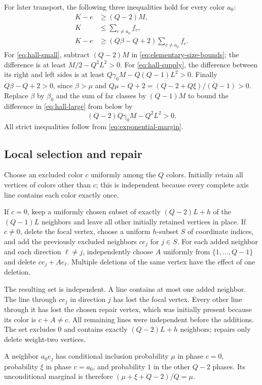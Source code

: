 \documentclass[11pt]{article}
\theoremstyle{definition}
\theoremstyle{remark}
\begin{document}
For later transport, the following three inequalities hold for every
color $a_0$:
\begin{align}
 K-e&\ge (Q-2)M, \label{eq:hall-small}\\
 K&\le\sum_{c\ne a_0}f_c, \label{eq:hall-supply}\\
 K-e&\ge (Q\beta-Q+2)\sum_{c\ne a_0}f_c.
 \label{eq:hall-large}
\end{align}
For \eqref{eq:hall-small}, subtract $(Q-2)M$ in
\eqref{eq:elementary-size-bounds}; the difference is at least
$M/2-Q^2L^2>0$.  For \eqref{eq:hall-supply}, the difference between its
right and left sides is at least
$Q\gamma_0M-Q(Q-1)L^2>0$.  Finally $Q\beta-Q+2>0$, since
$\beta>\mu$ and
$Q\mu-Q+2=(Q-2+Q\xi)/(Q-1)>0$.
Replace $\beta$ by $\beta_0$ and the sum of far classes by $(Q-1)M$ to
bound the difference in \eqref{eq:hall-large} from below by
\[
 (Q-2)Q\gamma_0M-Q^2L^2>0.
\]
All strict inequalities follow from \eqref{eq:exponential-margin}.

\subsection{Local selection and repair}
\label{app:local-repair}

Choose an excluded color $c$ uniformly among the $Q$ colors.  Initially
retain all vertices of colors other than $c$; this is independent because
every complete axis line contains each color exactly once.

If $c=0$, keep a uniformly chosen subset of exactly $(Q-2)L+h$ of the
$(Q-1)L$ neighbors and leave all other initially retained vertices in
place.  If $c\ne0$, delete the focal vertex, choose a uniform $h$-subset
$S$ of coordinate indices, and add the previously excluded neighbors
$c e_j$ for $j\in S$.  For each added neighbor and each direction
$\ell\ne j$, independently choose $A$ uniformly from
$\{1,\ldots,Q-1\}$ and delete $c e_j+A e_\ell$.  Multiple deletions of
the same vertex have the effect of one deletion.

The resulting set is independent.  A line contains at most one added
neighbor.  The line through $c e_j$ in direction $j$ has lost the focal
vertex.  Every other line through it has lost the chosen repair vertex,
which was initially present because its color is $c+A\ne c$.
All remaining lines were independent before the additions.  The set
excludes $0$ and contains exactly $(Q-2)L+h$ neighbors; repairs only
delete weight-two vertices.

A neighbor $a_0e_j$ has conditional inclusion probability $\mu$ in phase
$c=0$, probability $\xi$ in phase $c=a_0$, and probability $1$ in the
other $Q-2$ phases.  Its unconditional marginal is therefore
$(\mu+\xi+Q-2)/Q=\mu$.
\end{document}
